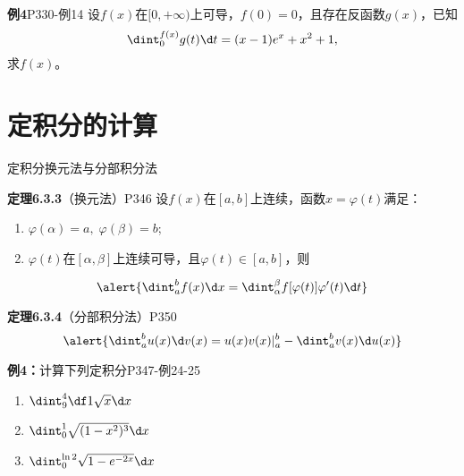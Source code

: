 \begin{frame}
	\linespread{1.2}
	\begin{exampleblock}{{\bf 例4}\hfill P330-例14}
		设$f(x)$在$[0,+\infty)$上可导，$f(0)=0$，且存在反函数$g(x)$，已知
		$$\dint_0^{f(x)}g(t)\d t=(x-1)e^x+x^2+1,$$
		求$f(x)$。
	\end{exampleblock}
\end{frame}

\section{定积分的计算}

\begin{frame}{定积分换元法与分部积分法}
	\linespread{1.2}\pause 
	\begin{block}{{\bf 定理6.3.3}（换元法）\hfill P346}
		设$f(x)$在$[a,b]$上连续，函数$x=\varphi(t)$满足：
		\begin{enumerate}
		  \item $\varphi(\alpha)=a,\;\varphi(\beta)=b$;
		  \item $\varphi(t)$在$[\alpha,\beta]$上连续可导，且$\varphi(t)\in[a,b]$，则
		\end{enumerate}
		$$\alert{\dint_a^bf(x)\d
		x=\dint_{\alpha}^{\beta}f[\varphi(t)]\varphi'(t)\d t}$$ \end{block}\pause 
	\begin{block}{{\bf 定理6.3.4}（分部积分法）\hfill P350}
		$$\alert{\dint_a^bu(x)\d v(x)=u(x)v(x)|_a^b-\dint_a^bv(x)\d u(x)}$$
	\end{block}
\end{frame}

\begin{frame}
	\linespread{1.2}
	\begin{exampleblock}{{\bf 例4：}计算下列定积分\hfill P347-例24-25}\pause 
				\begin{enumerate}
				  \item $\dint_9^4\df 1{\sqrt x}\d x$\pause 
				  \item $\dint_0^1\sqrt{(1-x^2)^3}\d x$\pause 
				  \item $\dint_0^{\ln 2}\sqrt{1-e^{-2x}}\d x$
				\end{enumerate}
	\end{exampleblock}
\end{frame}

